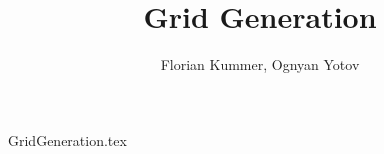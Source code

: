 \documentclass[10pt,a4paper]{article}
\title{Grid Generation}
\author{Florian Kummer, Ognyan Yotov}
\begin{document}
\maketitle

{GridGeneration.tex}
\end{document}
